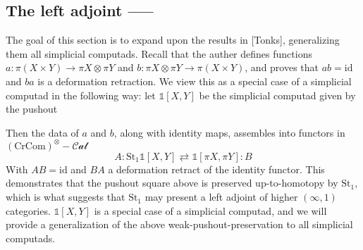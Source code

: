 \documentclass[12pt]{article}
\theoremstyle{definition}
\newcommand{\crcom}{\text{CrCom}}
\newcommand{\tensorcrossedcat}{(\crcom)^\otimes-\mathcal{Cat}}
\newcommand{\id}{\text{id}}
\begin{document}
	\subsection{The left adjoint -----}
	The goal of this section is to expand upon the results in [Tonks], generalizing them all simplicial computads. Recall that the auther defines functions $a: \pi(X \times Y) \to \pi X \otimes \pi Y$ and $b: \pi X \otimes \pi Y \to \pi (X \times Y) $, and proves that $ab = \id$ and $ba$ is a deformation retraction. We view this as a special case of a simplicial computad in the following way: let $\mathds{1}[X,Y]$ be the simplicial computad given by the pushout
	\begin{center}
	\end{center}
Then the data of $a$ and $b$, along with identity maps, assembles into functors in $\tensorcrossedcat$
$$A: \text{St}_1\mathds{1}[X,Y] \rightleftarrows \mathds{1}[\pi X, \pi Y]: B$$
With $AB = \id$ and $BA$ a deformation retract of the identity functor. This demonstrates that the pushout square above is preserved up-to-homotopy by $\text{St}_1$, which is what suggests that $\text{St}_1$ may present a left adjoint of higher $(\infty,1)$ categories. $\mathds{1}[X,Y]$ is a special case of a simplicial computad, and we will provide a generalization of the above weak-pushout-preservation to all simplicial computads. 
\\\\
\end{document}
